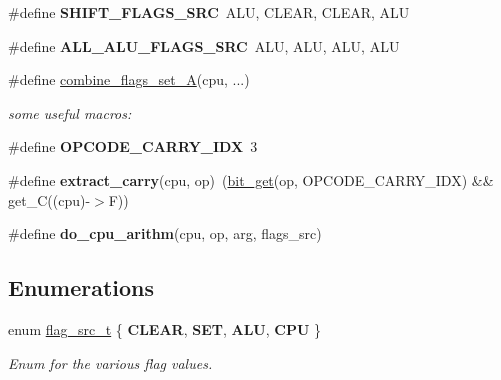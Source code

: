 \begin{DoxyCompactItemize}
\item 
\mbox{\label{cpu-alu_8h_ac95614cd2738287600aa6a24616d9da9}} 
\#define {\bfseries S\+H\+I\+F\+T\+\_\+\+F\+L\+A\+G\+S\+\_\+\+S\+RC}~A\+LU,   C\+L\+E\+AR, C\+L\+E\+AR, A\+LU
\item 
\mbox{\label{cpu-alu_8h_a090bbca7207d0de64aa21309b7bc9eea}} 
\#define {\bfseries A\+L\+L\+\_\+\+A\+L\+U\+\_\+\+F\+L\+A\+G\+S\+\_\+\+S\+RC}~A\+LU,   A\+LU,   A\+LU,   A\+LU
\item 
\#define \hyperlink{cpu-alu_8h_a23ade8162e2334e23894c4a1fb23c834}{combine\+\_\+flags\+\_\+set\+\_\+A}(cpu, ...)
\begin{DoxyCompactList}\small\item\em some useful macros\+: \end{DoxyCompactList}\item 
\mbox{\label{cpu-alu_8h_a162a740408ccd75dba4f7b918fcf5e9c}} 
\#define {\bfseries O\+P\+C\+O\+D\+E\+\_\+\+C\+A\+R\+R\+Y\+\_\+\+I\+DX}~3
\item 
\mbox{\label{cpu-alu_8h_ae72e429464d29d1b2ed70580e3f9be5e}} 
\#define {\bfseries extract\+\_\+carry}(cpu,  op)~(\hyperlink{bit_8h_afa7f855f3ed3b9234b74bc3805cc82e3}{bit\+\_\+get}(op, O\+P\+C\+O\+D\+E\+\_\+\+C\+A\+R\+R\+Y\+\_\+\+I\+DX) \&\& get\+\_\+C((cpu)-\/$>$F))
\item 
\#define {\bfseries do\+\_\+cpu\+\_\+arithm}(cpu,  op,  arg,  flags\+\_\+src)
\end{DoxyCompactItemize}
\subsection*{Enumerations}
\begin{DoxyCompactItemize}
\item 
\mbox{\label{cpu-alu_8h_a4c967c3e85658e567133a3f087ad8da9}} 
enum \hyperlink{cpu-alu_8h_a4c967c3e85658e567133a3f087ad8da9}{flag\+\_\+src\+\_\+t} \{ {\bfseries C\+L\+E\+AR}, 
{\bfseries S\+ET}, 
{\bfseries A\+LU}, 
{\bfseries C\+PU}
 \}\begin{DoxyCompactList}\small\item\em Enum for the various flag values. \end{DoxyCompactList}
\end{DoxyCompactItemize}
